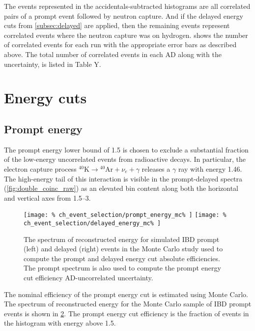 The events represented in the accidentals-subtracted histograms
are all correlated pairs
of a prompt event followed by neutron capture.
And if the delayed energy cuts from \cref{subsec:delayed} are applied,
then the remaining events represent correlated events
where the neutron capture was on hydrogen.
 shows the number of correlated events for each run
with the appropriate error bars as described above.
The total number of correlated events in each AD
along with the uncertainty, is listed in Table Y.

\begin{figure}
    \caption{}
    \label{fig:ncorr}
\end{figure}


\section{Energy cuts}
\label{sec:energy_cuts}

\subsection{Prompt energy}
The prompt energy lower bound of \SI{1.5}{\mev}
is chosen to exclude a substantial fraction
of the low-energy uncorrelated events from radioactive decays.
In particular, the electron capture process
${}^{40}\text{K} \to {}^{40}\text{Ar} + \nu_e + \gamma$
releases a $\gamma$ ray with energy \SI{1.46}{\mev}.
The high-energy tail of this interaction is visible in the prompt-delayed spectra
(\cref{fig:double_coinc_raw}) as an elevated bin content
along both the horizontal and vertical axes from \SIrange{1.5}{3}{\mev}.

\begin{figure}
    \centering
    \texttt{[image: \%
        ch\_event\_selection/prompt\_energy\_mc\%
    ]}
    \texttt{[image: \%
        ch\_event\_selection/delayed\_energy\_mc\%
    ]}
    \caption{The spectrum of reconstructed energy for simulated IBD prompt (left)
        and delayed (right) events
        in the Monte Carlo study used to compute the prompt and delayed
        energy cut absolute efficiencies.
        The prompt spectrum is also used to compute the prompt energy cut
    efficiency AD-uncorrelated uncertainty.}
    \label{fig:prompt_eff_mc}
\end{figure}
The nominal efficiency of the prompt energy cut is estimated using Monte Carlo.
The spectrum of reconstructed energy for the Monte Carlo sample of IBD prompt events
is shown in \cref{fig:prompt_eff_mc}.
The prompt energy cut efficiency is the fraction of events in the histogram
with energy above \SI{1.5}{\mev}.

